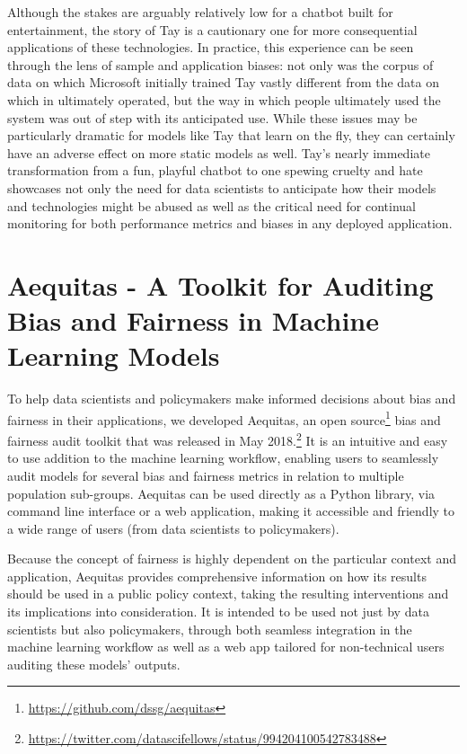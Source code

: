 \documentclass[]{krantz}
\begin{document}
Although the stakes are arguably relatively low for a chatbot built for
entertainment, the story of Tay is a cautionary one for more
consequential applications of these technologies. In practice, this
experience can be seen through the lens of sample and application
biases: not only was the corpus of data on which Microsoft initially
trained Tay vastly different from the data on which in ultimately
operated, but the way in which people ultimately used the system was out
of step with its anticipated use. While these issues may be particularly
dramatic for models like Tay that learn on the fly, they can certainly
have an adverse effect on more static models as well. Tay's nearly
immediate transformation from a fun, playful chatbot to one spewing
cruelty and hate showcases not only the need for data scientists to
anticipate how their models and technologies might be abused as well as
the critical need for continual monitoring for both performance metrics
and biases in any deployed application.

\section{Aequitas - A Toolkit for Auditing Bias and Fairness in Machine
Learning
Models}\label{aequitas---a-toolkit-for-auditing-bias-and-fairness-in-machine-learning-models}

To help data scientists and policymakers make informed decisions about
bias and fairness in their applications, we developed Aequitas, an open
source\footnote{\url{https://github.com/dssg/aequitas}} bias and
fairness audit toolkit that was released in May 2018.\footnote{\url{https://twitter.com/datascifellows/status/994204100542783488}}
It is an intuitive and easy to use addition to the machine learning
workflow, enabling users to seamlessly audit models for several bias and
fairness metrics in relation to multiple population sub-groups. Aequitas
can be used directly as a Python library, via command line interface or
a web application, making it accessible and friendly to a wide range of
users (from data scientists to policymakers).

Because the concept of fairness is highly dependent on the particular
context and application, Aequitas provides comprehensive information on
how its results should be used in a public policy context, taking the
resulting interventions and its implications into consideration. It is
intended to be used not just by data scientists but also policymakers,
through both seamless integration in the machine learning workflow as
well as a web app tailored for non-technical users auditing these
models' outputs.
\end{document}
